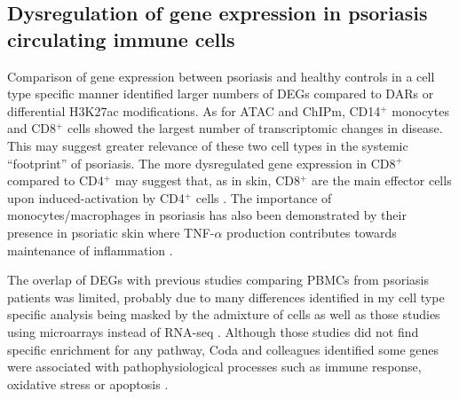 \subsection{Dysregulation of gene expression in psoriasis circulating immune cells}
Comparison of gene expression between psoriasis and healthy controls in a cell type specific manner identified larger numbers of DEGs compared to DARs or differential H3K27ac modifications. As for ATAC and ChIPm, CD14$^+$ monocytes and CD8$^+$ cells showed the largest number of transcriptomic changes in disease. This may suggest greater relevance of these two cell types in the systemic “footprint” of psoriasis.   The more dysregulated gene expression in CD8$^+$ compared to CD4$^+$ may suggest that, as in skin, CD8$^+$ are the main effector cells upon induced-activation by CD4$^+$ cells \parencite{Nickoloff1999}. The importance of monocytes/macrophages in psoriasis has also been demonstrated by their presence in psoriatic skin where TNF-$\alpha$ production contributes towards maintenance of inflammation \parencite{Nickoloff2000,Wang2006}. 

The overlap of DEGs with previous studies comparing PBMCs from psoriasis patients was limited, probably due to many differences identified in my cell type specific analysis being masked by the admixture of cells as well as those studies using microarrays instead of RNA-seq \parencite{Lee2009,Coda2012}. Although those studies did not find specific enrichment for any pathway, Coda and colleagues identified some genes were associated with pathophysiological processes such as immune response, oxidative stress or apoptosis \parencite{Coda2012.}. 

